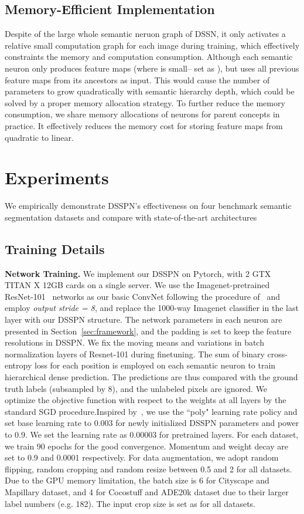 \documentclass[10pt,twocolumn,letterpaper]{article}
\begin{document}
\subsection{Memory-Efficient Implementation}

Despite of the large whole semantic neruon graph of DSSN, it only activates a relative small computation graph for each image during training, which effectively constraints the memory and computation consumption. Although each semantic neuron only produces  feature maps (where  is small– set as ), but uses all previous feature maps from its ancestors as input. This would cause the number of parameters to grow quadratically with semantic hierarchy depth, which could be solved by a proper memory allocation strategy. To further reduce the memory consumption, we share memory allocations of neurons for parent concepts in practice. It effectively reduces the memory cost for storing feature maps from quadratic to linear.

\section{Experiments}
We empirically demonstrate DSSPN’s effectiveness on four benchmark semantic segmentation datasets and compare with state-of-the-art architectures

\subsection{Training Details}
\label{sec:training}
\textbf{Network Training.} We implement our DSSPN on Pytorch, with 2 GTX TITAN X 12GB cards on a single server. We use the Imagenet-pretrained ResNet-101~\cite{he2016deep} networks as our basic ConvNet following the procedure of~\cite{chen2016deeplab} and employ \emph{output stride = 8}, and replace the 1000-way Imagenet classifier in the last layer with our DSSPN structure. The network parameters in each neuron are presented in Section~\ref{sec:framework}, and the padding is set to keep the feature resolutions in DSSPN. We fix the moving means and variations in batch normalization layers of Resnet-101 during finetuning. The sum of binary cross-entropy loss for each position is employed on each semantic neuron to train hierarchical dense prediction. The predictions are thus compared with the ground truth labels (subsampled by 8), and the unlabeled pixels are ignored. We optimize the objective function with respect to the weights at all layers by the standard SGD procedure.Inspired by~\cite{chen2016deeplab}, we use the ``poly" learning rate policy and set base learning rate to 0.003 for newly initialized DSSPN parameters and power to 0.9. We set the learning rate as 0.00003 for pretrained layers. For each dataset, we train 90 epochs for the good convergence. Momentum and weight decay are set to 0.9 and 0.0001 respectively. For data augmentation, we adopt random flipping, random cropping and random resize between 0.5 and 2 for all datasets. Due to the GPU memory limitation, the batch size is 6 for Cityscape and Mapillary dataset, and 4 for Cocostuff and ADE20k dataset due to their larger label numbers (e.g. 182). The input crop size is set as  for all datasets.
\end{document}
